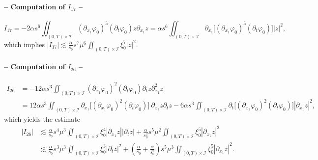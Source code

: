 \documentclass[a4paper, 12pt]{article}
\theoremstyle{plain}
\theoremstyle{definition}
\numberwithin{theorem}{section}
\numberwithin{equation}{section}
\begin{document}
{\paragraph{-- Computation of $I_{17}$ --}
$$
I_{17}=-2\alpha s^6\iint_{(0,T)\times\mathcal{I}}(\partial_{x_1}\varphi_0)^5(\partial_t\varphi_0)z\partial_{x_1}z=\alpha s^6\iint_{(0,T)\times\mathcal{I}}\partial_{x_1}\Big[(\partial_{x_1}\varphi_0)^5(\partial_t\varphi_0)\Big]|z|^2,$$
which implies
$
\displaystyle |I_{17}|\lesssim  \frac{\alpha}{s_0} s^7\mu^6\iint_{(0,T)\times\mathcal{I}}\xi_0^{7}|z|^2.
$
\paragraph{-- Computation of $I_{26}$ --}
\begin{align*}
I_{26}&=-12\alpha s^3\iint_{(0,T)\times\mathcal{I}}(\partial_{x_1}\varphi_0)^2 (\partial_t\varphi_0) \partial_tz \partial^2_{x_1}z\\
&=12\alpha s^3\iint_{(0,T)\times\mathcal{I}}\partial_{x_1}\Big[(\partial_{x_1}\varphi_0)^2 (\partial_t\varphi_0)\Big]~\partial_{x_1}z \partial_tz-6\alpha s^3\iint_{(0,T)\times\mathcal{I}}\partial_t\Big[(\partial_{x_1}\varphi_0)^2 (\partial_t\varphi_0)\Big] |\partial_{x_1}z|^2,
\end{align*}
which yields the estimate
\begin{align*}
|I_{26}|&\lesssim  \frac{\alpha}{s_0} s^4 \mu^3\iint_{(0,T)\times\mathcal{I}}\xi_0^{4} |\partial_{x_1}z||\partial_tz|+\frac{\alpha}{s_0^2} s^5 \mu^2 \iint_{(0,T)\times\mathcal{I}}\xi_0^{5} |\partial_{x_1}z|^2\\
& \lesssim \frac{\alpha}{s_0} s^3 \mu^3\iint_{(0,T)\times\mathcal{I}}\xi_0^3 |\partial_tz|^2+\left(\frac{\alpha}{s_0}+\frac{\alpha}{s_0^2}\right) s^5 \mu^3 \iint_{(0,T)\times\mathcal{I}}\xi_0^{5}|\partial_{x_1}z|^2.
\end{align*}
}
\end{document}
